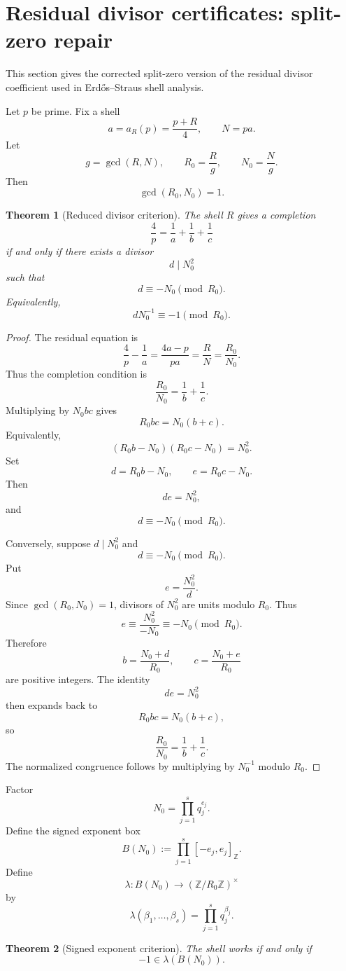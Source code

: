 \documentclass[11pt]{article}
\newtheorem{theorem}{Theorem}[section]
\newcommand{\ZZ}{\mathbb Z}
\begin{document}
\section{Residual divisor certificates: split-zero repair}

This section gives the corrected split-zero version of the residual divisor coefficient used in Erdős--Straus shell analysis.

Let \(p\) be prime. Fix a shell
\[
a=a_R(p)=\frac{p+R}{4},
\qquad
N=pa.
\]
Let
\[
g=\gcd(R,N),\qquad R_0=\frac Rg,\qquad N_0=\frac Ng.
\]
Then
\[
\gcd(R_0,N_0)=1.
\]

\begin{theorem}[Reduced divisor criterion]
The shell \(R\) gives a completion
\[
\frac4p=\frac1a+\frac1b+\frac1c
\]
if and only if there exists a divisor
\[
d\mid N_0^2
\]
such that
\[
d\equiv -N_0\pmod{R_0}.
\]
Equivalently,
\[
dN_0^{-1}\equiv -1\pmod{R_0}.
\]
\end{theorem}

\begin{proof}
The residual equation is
\[
\frac4p-\frac1a=\frac{4a-p}{pa}=\frac RN=\frac{R_0}{N_0}.
\]
Thus the completion condition is
\[
\frac{R_0}{N_0}=\frac1b+\frac1c.
\]
Multiplying by \(N_0bc\) gives
\[
R_0bc=N_0(b+c).
\]
Equivalently,
\[
(R_0b-N_0)(R_0c-N_0)=N_0^2.
\]
Set
\[
d=R_0b-N_0,\qquad e=R_0c-N_0.
\]
Then
\[
de=N_0^2,
\]
and
\[
d\equiv -N_0\pmod{R_0}.
\]

Conversely, suppose \(d\mid N_0^2\) and
\[
d\equiv -N_0\pmod{R_0}.
\]
Put
\[
e=\frac{N_0^2}{d}.
\]
Since \(\gcd(R_0,N_0)=1\), divisors of \(N_0^2\) are units modulo \(R_0\). Thus
\[
e\equiv \frac{N_0^2}{-N_0}\equiv -N_0\pmod{R_0}.
\]
Therefore
\[
b=\frac{N_0+d}{R_0},
\qquad
c=\frac{N_0+e}{R_0}
\]
are positive integers. The identity
\[
de=N_0^2
\]
then expands back to
\[
R_0bc=N_0(b+c),
\]
so
\[
\frac{R_0}{N_0}=\frac1b+\frac1c.
\]
The normalized congruence follows by multiplying by \(N_0^{-1}\) modulo \(R_0\).
\end{proof}

Factor
\[
N_0=\prod_{j=1}^s q_j^{e_j}.
\]
Define the signed exponent box
\[
B(N_0):=\prod_{j=1}^s[-e_j,e_j]_{\ZZ}.
\]
Define
\[
\lambda:B(N_0)\to(\ZZ/R_0\ZZ)^\times
\]
by
\[
\lambda(\beta_1,\dots,\beta_s)=\prod_{j=1}^s q_j^{\beta_j}.
\]

\begin{theorem}[Signed exponent criterion]
The shell works if and only if
\[
-1\in\lambda(B(N_0)).
\]
\end{theorem}
\end{document}
